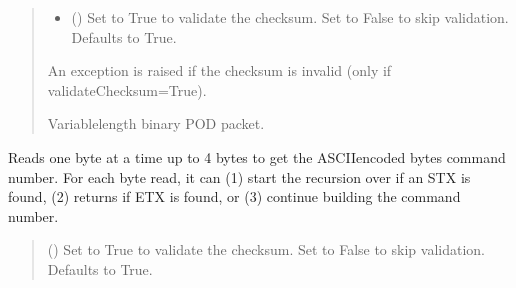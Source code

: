 \documentclass[letterpaper,10pt,english]{sphinxmanual}
\begin{document}
\begin{fulllineitems}
\begin{fulllineitems}
\begin{quote}
\begin{description}
\begin{itemize}
\item {} 
\sphinxAtStartPar
{} (\sphinxstyleliteralemphasis{\sphinxupquote{, }}) \textendash{} Set to True to validate the checksum. Set to False to                 skip validation. Defaults to True.

\end{itemize}

\sphinxAtStartPar
{} \textendash{} An exception is raised if the checksum is invalid (only if validateChecksum=True).

\sphinxAtStartPar
Variable\sphinxhyphen{}length binary POD packet.

\sphinxAtStartPar
{\hyperref[\detokenize{PodApi.Packets:PodApi.Packets.Binary.PacketBinary}]{}}

\end{description}\end{quote}

\end{fulllineitems}


\begin{fulllineitems}
\label{\detokenize{PodApi.Devices:PodApi.Devices.BasicPodProtocol.Pod._Read_GetCommand}}
\pysigstartsignatures
{}
\pysigstopsignatures
\sphinxAtStartPar
Reads one byte at a time up to 4 bytes to get the ASCII\sphinxhyphen{}encoded bytes command number. For each         byte read, it can (1) start the recursion over if an STX is found, (2) returns if ETX is found, or         (3) continue building the command number.
\begin{quote}\begin{description}
\sphinxAtStartPar
{} (\sphinxstyleliteralemphasis{\sphinxupquote{, }}) \textendash{} Set to True to validate the checksum. Set to False to skip                 validation. Defaults to True.


\end{description}
\end{quote}
\end{fulllineitems}
\end{fulllineitems}
\end{document}
